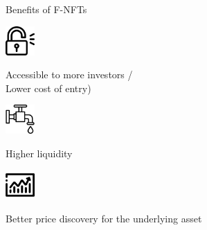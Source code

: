 \documentclass[handout]{beamer}
\begin{document}
\begin{frame}{Benefits of F-NFTs}

\begin{minipage}{0.2\textwidth}
			\begin{center}
				\includegraphics[height=3em]{../assets/images/unlocked_padlock.png}
				
			\end{center}
		\end{minipage}
		\hspace{1 em}
		\begin{minipage}{0.72\textwidth}
			Accessible to more investors / \\ Lower cost of entry)

		\end{minipage}
	
		\pause
		\vspace{2 em}
		\begin{minipage}{0.2\textwidth}
			\begin{center}
				\includegraphics[height=3em]{../assets/images/faucet.png}
			\end{center}
		\end{minipage}
		\hspace{1 em}
		\begin{minipage}{0.72\textwidth}
			Higher liquidity \\

		\end{minipage}
	
		\pause
		\vspace{2 em}
		\begin{minipage}{0.2\textwidth}
			\begin{center}
				\includegraphics[height=3em]{../assets/images/exchange.png}
			\end{center}
		\end{minipage}
		\hspace{1 em}
		\begin{minipage}{0.72\textwidth}
		Better price discovery for the underlying asset 
		\end{minipage}


\end{frame}
\end{document}
